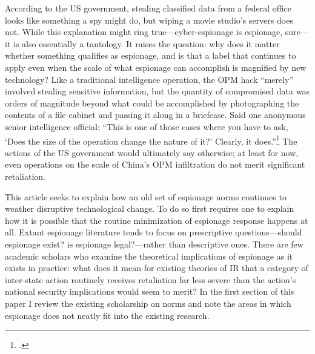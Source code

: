 \documentclass[12pt]{extarticle}
\begin{document}
According to the US government, stealing classified data from a federal office looks like something a spy might do, but wiping a movie studio's servers does not. While this explanation might ring true---cyber-espionage is espionage, sure---it is also essentially a tautology. It raises the question: why does it matter whether something qualifies as espionage, and is that a label that continues to apply even when the scale of what espionage can accomplish is magnified by new technology? Like a traditional intelligence operation, the OPM hack \enquote{merely} involved stealing sensitive information, but the quantity of compromised data was orders of magnitude beyond what could be accomplished by photographing the contents of a file cabinet and passing it along in a briefcase. Said one anonymous senior intelligence official: \enquote{This is one of those cases where you have to ask, \enquote{Does the size of the operation change the nature of it?} Clearly, it does.}\footcite{sanger_u.s._2015} The actions of the US government would ultimately say otherwise; at least for now, even operations on the scale of China's OPM infiltration do not merit significant retaliation.

This article seeks to explain how an old set of espionage norms continues to weather disruptive technological change. To do so first requires one to explain how it is possible that the routine minimization of espionage response happens at all. Extant espionage literature tends to focus on prescriptive questions---should espionage exist? is espionage legal?---rather than descriptive ones. There are few academic scholars who examine the theoretical implications of espionage as it exists in practice: what does it mean for existing theories of IR that a category of inter-state action routinely receives retaliation far less severe than the action's national security implications would seem to merit? In the first section of this paper I review the existing scholarship on norms and note the areas in which espionage does not neatly fit into the existing research.
\end{document}
